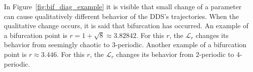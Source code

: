 \begin{remark}
    In Figure~\ref{fig:bif_diag_example} it is visible that small change of a parameter can cause qualitatively different behavior of the DDS's trajectories.
    When the qualitative change occurs, it is said that bifurcation has occurred.
    An example of a bifurcation point is $r = 1+\sqrt{8} \approx 3.82842$. For this $r$, the $\mathcal{L}_{r}$ changes its behavior from seemingly chaotic to $3$-periodic. 
    Another example of a bifurcation point is $r \approx 3.446$. For this $r$, the $\mathcal{L}_{r}$ changes its behavior from $2$-periodic to $4$-periodic.
\end{remark}

\endinput